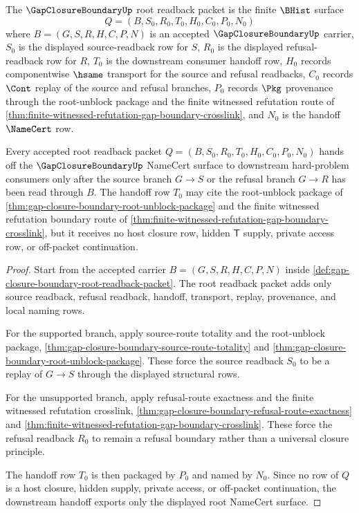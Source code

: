 \begin{definition}
\label{def:gap-closure-boundary-root-readback-packet}
The $\GapClosureBoundaryUp$ root readback packet is the finite $\BHist$ surface
$$
Q=(B,S_0,R_0,T_0,H_0,C_0,P_0,N_0)
$$
where $B=(G,S,R,H,C,P,N)$ is an accepted $\GapClosureBoundaryUp$ carrier, $S_0$ is the displayed source-readback row for $S$, $R_0$ is the displayed refusal-readback row for $R$, $T_0$ is the downstream consumer handoff row, $H_0$ records componentwise $\hsame$ transport for the source and refusal readbacks, $C_0$ records $\Cont$ replay of the source and refusal branches, $P_0$ records $\Pkg$ provenance through the root-unblock package and the finite witnessed refutation route of \autoref{thm:finite-witnessed-refutation-gap-boundary-crosslink}, and $N_0$ is the handoff $\NameCert$ row.
\end{definition}

\begin{theorem}
\label{thm:gap-closure-boundary-root-namecert-handoff}
Every accepted root readback packet $Q=(B,S_0,R_0,T_0,H_0,C_0,P_0,N_0)$ hands off the $\GapClosureBoundaryUp$ NameCert surface to downstream hard-problem consumers only after the source branch $G \longrightarrow S$ or the refusal branch $G \longrightarrow R$ has been read through $B$. The handoff row $T_0$ may cite the root-unblock package of \autoref{thm:gap-closure-boundary-root-unblock-package} and the finite witnessed refutation boundary route of \autoref{thm:finite-witnessed-refutation-gap-boundary-crosslink}, but it receives no host closure row, hidden $\mathsf{T}$ supply, private access row, or off-packet continuation.
\end{theorem}
\begin{proof}
Start from the accepted carrier $B=(G,S,R,H,C,P,N)$ inside \autoref{def:gap-closure-boundary-root-readback-packet}. The root readback packet adds only source readback, refusal readback, handoff, transport, replay, provenance, and local naming rows.

For the supported branch, apply source-route totality and the root-unblock package, \autoref{thm:gap-closure-boundary-source-route-totality} and \autoref{thm:gap-closure-boundary-root-unblock-package}. These force the source readback $S_0$ to be a replay of $G \longrightarrow S$ through the displayed structural rows.

For the unsupported branch, apply refusal-route exactness and the finite witnessed refutation crosslink, \autoref{thm:gap-closure-boundary-refusal-route-exactness} and \autoref{thm:finite-witnessed-refutation-gap-boundary-crosslink}. These force the refusal readback $R_0$ to remain a refusal boundary rather than a universal closure principle.

The handoff row $T_0$ is then packaged by $P_0$ and named by $N_0$. Since no row of $Q$ is a host closure, hidden supply, private access, or off-packet continuation, the downstream handoff exports only the displayed root NameCert surface.
\end{proof}

